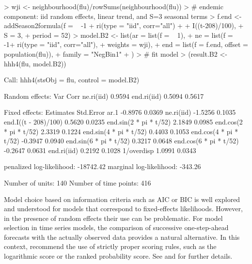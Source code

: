 \documentclass[a4paper,11pt]{article}
\begin{document}
\begin{Schunk}
\begin{Sinput}
> wji <- neighbourhood(flu)/rowSums(neighbourhood(flu))
> # endemic component: iid random effects, linear trend, and S=3 seasonal terms
> f.end <- addSeason2formula(f = ~ -1 + ri(type = "iid", corr="all") + 
+                                 I((t-208)/100), 
+                                 S = 3, 
+                                 period = 52)
> model.B2 <- list(ar = list(f = ~ 1),
+                  ne = list(f = ~ -1+ ri(type = "iid", corr="all"), 
+                            weights = wji),
+                  end = list(f = f.end, offset = population(flu)),
+                  family = "NegBin1"
+                  )
> # fit model
> (result.B2 <- hhh4(flu, model.B2))
\end{Sinput}
\end{Schunk}
\begin{Schunk}
\begin{Soutput}
Call: 
hhh4(stsObj = flu, control = model.B2)

Random effects: 
            Var    Corr   
ne.ri(iid)  0.9594        
end.ri(iid) 0.5094 0.5617 


Fixed effects: 
                        Estimates  Std.Error
ar.1                      -0.8976     0.0369
ne.ri(iid)                -1.5256     0.1035
end.I((t - 208)/100)       0.5620     0.0235
end.sin(2 * pi * t/52)     2.1849     0.0985
end.cos(2 * pi * t/52)     2.3319     0.1224
end.sin(4 * pi * t/52)     0.4403     0.1053
end.cos(4 * pi * t/52)    -0.3947     0.0940
end.sin(6 * pi * t/52)     0.3217     0.0648
end.cos(6 * pi * t/52)    -0.2647     0.0631
end.ri(iid)                0.2192     0.1028
1/overdisp                 1.0991     0.0343

penalized log-likelihood:  -18742.42 
marginal log-likelihood:   -343.26 

Number of units:          140 
Number of time points:    416 
\end{Soutput}
\end{Schunk}
Model choice based on information criteria such as AIC or BIC is well
explored and understood for models that correspond to fixed-effects likelihoods.
However, in the presence of random effects their use can be problematic.
For model selection in time series models, the comparison of successive 
one-step-ahead forecasts with the actually observed data 
provides a natural alternative. In this context, \cite{gneiting-raftery-2007}
recommend the use of strictly proper scoring 
rules, such as the logarithmic score or the ranked probability score.
See \cite{czado-etal-2009} and \cite{paul-held-2010} for further details.
\end{document}
